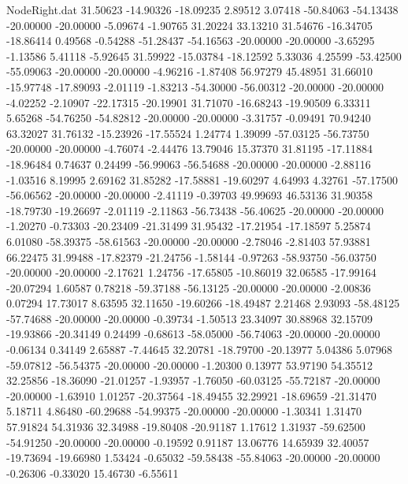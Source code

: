 \begin{filecontents}{NodeRight.dat}
  31.50623  -14.90326  -18.09235     2.89512    3.07418  -50.84063  -54.13438  -20.00000  -20.00000   -5.09674   -1.90765   31.20224   33.13210
  31.54676  -16.34705  -18.86414     0.49568   -0.54288  -51.28437  -54.16563  -20.00000  -20.00000   -3.65295   -1.13586    5.41118   -5.92645
  31.59922  -15.03784  -18.12592     5.33036    4.25599  -53.42500  -55.09063  -20.00000  -20.00000   -4.96216   -1.87408   56.97279   45.48951
  31.66010  -15.97748  -17.89093    -2.01119   -1.83213  -54.30000  -56.00312  -20.00000  -20.00000   -4.02252   -2.10907  -22.17315  -20.19901
  31.71070  -16.68243  -19.90509     6.33311    5.65268  -54.76250  -54.82812  -20.00000  -20.00000   -3.31757   -0.09491   70.94240   63.32027
  31.76132  -15.23926  -17.55524     1.24774    1.39099  -57.03125  -56.73750  -20.00000  -20.00000   -4.76074   -2.44476   13.79046   15.37370
  31.81195  -17.11884  -18.96484     0.74637    0.24499  -56.99063  -56.54688  -20.00000  -20.00000   -2.88116   -1.03516    8.19995    2.69162
  31.85282  -17.58881  -19.60297     4.64993    4.32761  -57.17500  -56.06562  -20.00000  -20.00000   -2.41119   -0.39703   49.99693   46.53136
  31.90358  -18.79730  -19.26697    -2.01119   -2.11863  -56.73438  -56.40625  -20.00000  -20.00000   -1.20270   -0.73303  -20.23409  -21.31499
  31.95432  -17.21954  -17.18597     5.25874    6.01080  -58.39375  -58.61563  -20.00000  -20.00000   -2.78046   -2.81403   57.93881   66.22475
  31.99488  -17.82379  -21.24756    -1.58144   -0.97263  -58.93750  -56.03750  -20.00000  -20.00000   -2.17621    1.24756  -17.65805  -10.86019
  32.06585  -17.99164  -20.07294     1.60587    0.78218  -59.37188  -56.13125  -20.00000  -20.00000   -2.00836    0.07294   17.73017    8.63595
  32.11650  -19.60266  -18.49487     2.21468    2.93093  -58.48125  -57.74688  -20.00000  -20.00000   -0.39734   -1.50513   23.34097   30.88968
  32.15709  -19.93866  -20.34149     0.24499   -0.68613  -58.05000  -56.74063  -20.00000  -20.00000   -0.06134    0.34149    2.65887   -7.44645
  32.20781  -18.79700  -20.13977     5.04386    5.07968  -59.07812  -56.54375  -20.00000  -20.00000   -1.20300    0.13977   53.97190   54.35512
  32.25856  -18.36090  -21.01257    -1.93957   -1.76050  -60.03125  -55.72187  -20.00000  -20.00000   -1.63910    1.01257  -20.37564  -18.49455
  32.29921  -18.69659  -21.31470     5.18711    4.86480  -60.29688  -54.99375  -20.00000  -20.00000   -1.30341    1.31470   57.91824   54.31936
  32.34988  -19.80408  -20.91187     1.17612    1.31937  -59.62500  -54.91250  -20.00000  -20.00000   -0.19592    0.91187   13.06776   14.65939
  32.40057  -19.73694  -19.66980     1.53424   -0.65032  -59.58438  -55.84063  -20.00000  -20.00000   -0.26306   -0.33020   15.46730   -6.55611

\end{filecontents}
